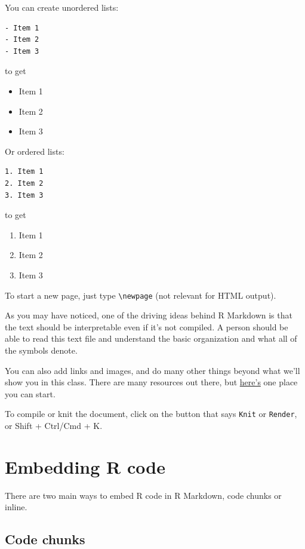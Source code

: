 \documentclass[
  letterpaper,
  DIV=11,
  numbers=noendperiod]{scrreprt}
\providecommand{\tightlist}{%
  \setlength{\itemsep}{0pt}\setlength{\parskip}{0pt}}\usepackage{longtable,booktabs,array}
\begin{document}
You can create unordered lists:

\begin{verbatim}
- Item 1
- Item 2
- Item 3
\end{verbatim}

to get

\begin{itemize}
\tightlist
\item
  Item 1
\item
  Item 2
\item
  Item 3
\end{itemize}

Or ordered lists:

\begin{verbatim}
1. Item 1
2. Item 2
3. Item 3
\end{verbatim}

to get

\begin{enumerate}
\def\labelenumi{\arabic{enumi}.}
\tightlist
\item
  Item 1
\item
  Item 2
\item
  Item 3
\end{enumerate}

To start a new page, just type \texttt{\textbackslash{}newpage} (not
relevant for HTML output).

As you may have noticed, one of the driving ideas behind R Markdown is
that the text should be interpretable even if it's not compiled. A
person should be able to read this text file and understand the basic
organization and what all of the symbols denote.

You can also add links and images, and do many other things beyond what
we'll show you in this class. There are many resources out there, but
\href{https://rmarkdown.rstudio.com/lesson-1.html}{here's} one place you
can start.

To compile or knit the document, click on the button that says
\texttt{Knit} or \texttt{Render}, or Shift + Ctrl/Cmd + K.

\hypertarget{embedding-r-code}{%
\section{Embedding R code}\label{embedding-r-code}}

There are two main ways to embed R code in R Markdown, code chunks or
inline.

\hypertarget{code-chunks}{%
\subsection{Code chunks}\label{code-chunks}}
\end{document}
